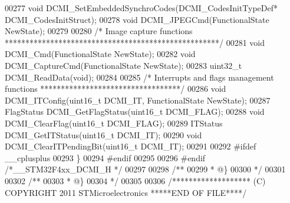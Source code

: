 \begin{DoxyCode}
00277 \textcolor{keywordtype}{void} DCMI_SetEmbeddedSynchroCodes(DCMI\_CodesInitTypeDef* DCMI\_CodesInitStruct);
00278 \textcolor{keywordtype}{void} DCMI_JPEGCmd(FunctionalState NewState);
00279 
00280 \textcolor{comment}{/* Image capture functions ****************************************************/}
00281 \textcolor{keywordtype}{void} DCMI_Cmd(FunctionalState NewState);
00282 \textcolor{keywordtype}{void} DCMI_CaptureCmd(FunctionalState NewState);
00283 uint32\_t DCMI_ReadData(\textcolor{keywordtype}{void});
00284 
00285 \textcolor{comment}{/* Interrupts and flags management functions **********************************/}
00286 \textcolor{keywordtype}{void} DCMI_ITConfig(uint16\_t DCMI\_IT, FunctionalState NewState);
00287 FlagStatus DCMI_GetFlagStatus(uint16\_t DCMI\_FLAG);
00288 \textcolor{keywordtype}{void} DCMI_ClearFlag(uint16\_t DCMI\_FLAG);
00289 ITStatus DCMI_GetITStatus(uint16\_t DCMI\_IT);
00290 \textcolor{keywordtype}{void} DCMI_ClearITPendingBit(uint16\_t DCMI\_IT);
00291 
00292 \textcolor{preprocessor}{#}\textcolor{preprocessor}{ifdef} \_\_cplusplus
00293 \}
00294 \textcolor{preprocessor}{#}\textcolor{preprocessor}{endif}
00295 
00296 \textcolor{preprocessor}{#}\textcolor{preprocessor}{endif} \textcolor{comment}{/*\_\_STM32F4xx\_DCMI\_H */}
00297 
00298 \textcolor{comment}{/**}
00299 \textcolor{comment}{  * @\}}
00300 \textcolor{comment}{  */}
00301 
00302 \textcolor{comment}{/**}
00303 \textcolor{comment}{  * @\}}
00304 \textcolor{comment}{  */}
00305 
00306 \textcolor{comment}{/******************* (C) COPYRIGHT 2011 STMicroelectronics *****END OF FILE****/}
\end{DoxyCode}
